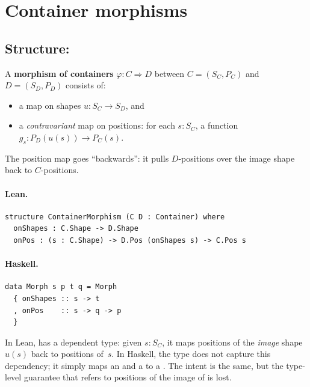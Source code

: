 \documentclass[11pt,a4paper]{article}
\begin{document}
\section{Container morphisms}

\subsection{Structure: }

\begin{defn}
A \textbf{morphism of containers} $\varphi : C \Rightarrow D$ between
$C = (S_C, P_C)$ and $D = (S_D, P_D)$ consists of:
\begin{itemize}
  \item a map on shapes $u : S_C \to S_D$, and
  \item a \emph{contravariant} map on positions: for each $s : S_C$,
        a function $g_s : P_D(u(s)) \to P_C(s)$.
\end{itemize}
The position map goes ``backwards'': it pulls $D$-positions over the image
shape back to $C$-positions.
\end{defn}

\paragraph{Lean.}
\begin{lstlisting}[style=lean]
structure ContainerMorphism (C D : Container) where
  onShapes : C.Shape -> D.Shape
  onPos : (s : C.Shape) -> D.Pos (onShapes s) -> C.Pos s
\end{lstlisting}

\paragraph{Haskell.}
\begin{lstlisting}[style=haskell]
data Morph s p t q = Morph
  { onShapes :: s -> t
  , onPos    :: s -> q -> p
  }
\end{lstlisting}

\begin{fidelitynote}
In Lean,  has a dependent type: given $s : S_C$, it maps positions
of the \emph{image} shape $u(s)$ back to positions of~$s$.  In Haskell, the
type  does not capture this dependency; it simply maps an
 and a  to a .  The intent is the same, but the
type-level guarantee that  refers to positions of the image of
 is lost.
\end{fidelitynote}
\end{document}
